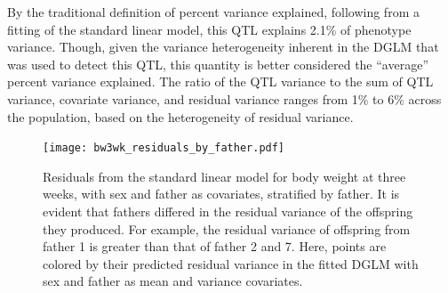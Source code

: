 By the traditional definition of percent variance explained, following from a fitting of the standard linear model, this QTL explains 2.1\% of phenotype variance.
Though, given the variance heterogeneity inherent in the DGLM that was used to detect this QTL, this quantity is better considered the ``average'' percent variance explained.
The ratio of the QTL variance to the sum of QTL variance, covariate variance, and residual variance ranges from 1\% to 6\% across the population, based on the heterogeneity of residual variance.


    \begin{figure}
        \centering
        \texttt{[image: bw3wk\_residuals\_by\_father.pdf]}
        \caption[
          Residuals from the standard linear model for body weight at three weeks, with sex and father as covariates, stratified by father.
        ]
        {
          Residuals from the standard linear model for body weight at three weeks, with sex and father as covariates, stratified by father.
          It is evident that fathers differed in the residual variance of the offspring they produced.
          For example, the residual variance of offspring from father 1 is greater than that of father 2 and 7.
          Here, points are colored by their predicted residual variance in the fitted DGLM with sex and father as mean and variance covariates.
        }
        \label{fig:bw3wk_resids}
    \end{figure}

